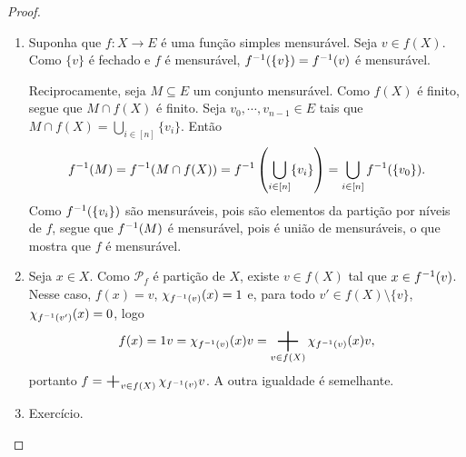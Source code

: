 \begin{proof}
	\begin{enumerate}
	\item Suponha que $f\colon X \to E$ é uma função simples mensurável. Seja $v \in f(X)$. Como $\{v\}$ é fechado e $f$ é mensurável, $f^{-1}(\{v\})=f^{-1}(v)$ é mensurável.

Reciprocamente, seja $M \subseteq E$ um conjunto mensurável. Como $f(X)$ é finito, segue que $M \cap f(X)$ é finito. Seja $v_0, \cdots,v_{n-1} \in E$ tais que $M \cap f(X) = \bigcup_{i \in [n]} \{v_i\}$. Então
		\begin{equation*}
		f^{-1}(M) = f^{-1}(M \cap f(X)) = f^{-1} \left( \bigcup_{i \in [n]} \{v_i\} \right) = \bigcup_{i \in [n]} f^{-1}(\{v_0\}).
		\end{equation*}
Como $f^{-1}(\{v_i\})$ são mensuráveis, pois são elementos da partição por níveis de $f$, segue que $f^{-1}(M)$ é mensurável, pois é união de mensuráveis, o que mostra que $f$ é mensurável.
	
	\item Seja $x \in X$. Como $\mathcal P_f$ é partição de $X$, existe $v \in f(X)$ tal que $x \in f^{-1}(v)$. Nesse caso, $f(x)=v$, $\chi_{f^{-1}(v)}(x)=1$ e, para todo $v' \in f(X) \setminus \{v\}$, $\chi_{f^{-1}(v')}(x)=0$, logo
		\begin{equation*}
		f(x) = 1v = \idc_{f\inv(v)}(x) v = \sum_{v \in f(X)} \idc_{f\inv(v)}(x) v,
		\end{equation*}
portanto $f=\sum_{v \in f(X)} \idc_{f\inv(v)} v$.
A outra igualdade é semelhante.
	
	\item Exercício.
	\end{enumerate}
\end{proof}

